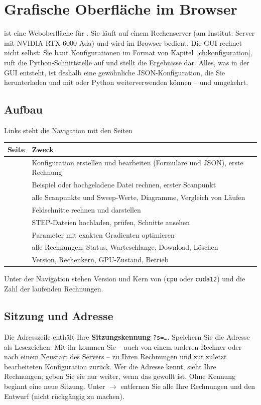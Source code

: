 \chapter{Grafische Oberfläche im Browser}\label{ch:gui}
%

\GUI{} ist eine Weboberfläche für \FG. Sie läuft auf einem Rechenserver (am Institut: Server mit NVIDIA RTX 6000
Ada) und wird im Browser bedient. Die GUI rechnet nicht selbst: Sie baut Konfigurationen im Format von
Kapitel~\ref{ch:konfiguration}, ruft die Python-Schnittstelle auf und stellt die Ergebnisse dar. Alles, was in der GUI
entsteht, ist deshalb eine gewöhnliche JSON-Konfiguration, die Sie herunterladen und mit  oder Python
weiterverwenden können -- und umgekehrt.

\section{Aufbau}
Links steht die Navigation mit den Seiten
\begin{center}
\small
\begin{tabularx}{\linewidth}{lY}
\toprule
Seite & Zweck \\
\midrule
{} & Konfiguration erstellen und bearbeiten (Formulare und JSON), erste Rechnung \\
 & Beispiel oder hochgeladene Datei rechnen, erster Scanpunkt \\
 & alle Scanpunkte und Sweep-Werte, Diagramme, Vergleich von Läufen \\
 & Feldschnitte rechnen und darstellen \\
 & STEP-Dateien hochladen, prüfen, Schnitte ansehen \\
 & Parameter mit exakten Gradienten optimieren \\
 & alle Rechnungen: Status, Warteschlange, Download, Löschen \\
 & Version, Rechenkern, GPU-Zustand, Betrieb \\
\bottomrule
\end{tabularx}
\end{center}
Unter der Navigation stehen Version und Kern von \FG{} (\texttt{cpu} oder \texttt{cuda12}) und die Zahl der laufenden
Rechnungen.

\section{Sitzung und Adresse}
Die Adresszeile enthält Ihre \textbf{Sitzungskennung} \texttt{?s=\ldots}. Speichern Sie die Adresse als Lesezeichen:
Mit ihr kommen Sie -- auch von einem anderen Rechner oder nach einem Neustart des Servers -- zu Ihren Rechnungen und
zur zuletzt bearbeiteten Konfiguration zurück. Wer die Adresse kennt, sieht Ihre Rechnungen; geben Sie sie nur weiter,
wenn das gewollt ist. Ohne Kennung beginnt eine neue Sitzung. Unter  $\to$ 
entfernen Sie alle Ihre Rechnungen und den Entwurf (nicht rückgängig zu machen).

